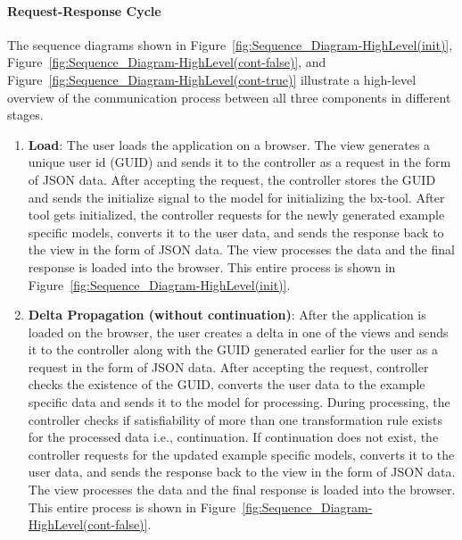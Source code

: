\paragraph{Request-Response Cycle} 
The sequence diagrams shown in Figure~\ref{fig:Sequence_Diagram-HighLevel(init)}, Figure~\ref{fig:Sequence_Diagram-HighLevel(cont-false)}, and Figure~\ref{fig:Sequence_Diagram-HighLevel(cont-true)} illustrate a high-level overview of the communication process between all three components in different stages.
\begin{enumerate}
	\item {\textbf{Load}: The user loads the application on a browser. The view generates a unique user id (GUID) and sends it to the controller as a request in the form of JSON data. After accepting the request, the controller stores the GUID and sends the initialize signal to the model for initializing the bx-tool. After tool gets initialized, the controller requests for the newly generated example specific models, converts it to the user data, and sends the response back to the view in the form of JSON data. The view processes the data and the final response is loaded into the browser. This entire process is shown in Figure~\ref{fig:Sequence_Diagram-HighLevel(init)}.}
	
	\item {\textbf{Delta Propagation (without continuation)}: After the application is loaded on the browser, the user creates a delta in one of the views and sends it to the controller along with the GUID generated earlier for the user as a request in the form of JSON data. After accepting the request, controller checks the existence of the GUID, converts the user data to the example specific data and sends it to the model for processing. During processing, the controller checks if satisfiability of more than one transformation rule exists for the processed data i.e., continuation. If continuation does not exist, the controller requests for the updated example specific models, converts it to the user data, and sends the response back to the view in the form of JSON data. The view processes the data and the final response is loaded into the browser. This entire process is shown in Figure~\ref{fig:Sequence_Diagram-HighLevel(cont-false)}.}
	

\end{enumerate}
